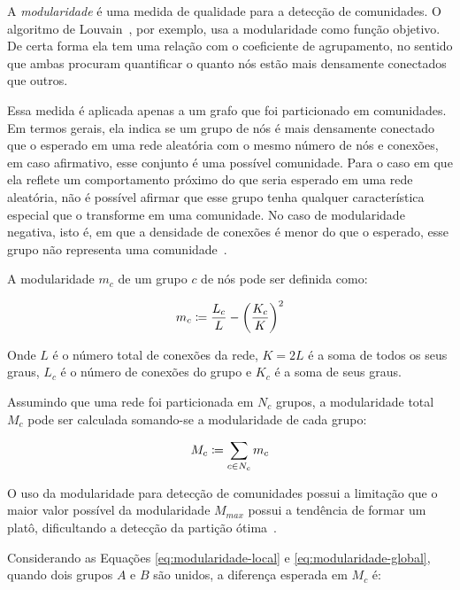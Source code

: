 \documentclass[12pt,a4paper]{article}
\begin{document}

A \textit{modularidade} é uma medida de qualidade para a detecção de comunidades. O algoritmo de Louvain~\cite{Blondel2008-qh}, por exemplo, usa a modularidade como função objetivo. De certa forma ela tem uma relação com o coeficiente de agrupamento, no sentido que ambas procuram quantificar o quanto nós estão mais densamente conectados que outros.

Essa medida é aplicada apenas a um grafo que foi particionado em comunidades. Em termos gerais, ela indica se um grupo de nós é mais densamente conectado que o esperado em uma rede aleatória com o mesmo número de nós e conexões, em caso afirmativo, esse conjunto é uma possível comunidade. Para o caso em que ela reflete um comportamento próximo do que seria esperado em uma rede aleatória, não é possível afirmar que esse grupo tenha qualquer característica especial que o transforme em uma comunidade. No caso de modularidade negativa, isto é, em que a densidade de conexões é menor do que o esperado, esse grupo não representa uma comunidade~\cite{Barabasi2016-rn}.

A modularidade $m_c$ de um grupo $c$ de nós pode ser definida como:

\begin{equation} \label{eq:modularidade-local}
m_c \coloneqq \frac{L_c}{L} - \left( \frac{K_c}{K} \right)^2
\end{equation}

Onde $L$ é o número total de conexões da rede, $K = 2L$ é a soma de todos os seus graus, $L_c$ é o número de conexões do grupo e $K_c$ é a soma de seus graus.

Assumindo que uma rede foi particionada em $N_c$ grupos, a modularidade total $M_c$ pode ser calculada somando-se a modularidade de cada grupo:

\begin{equation} \label{eq:modularidade-global}
M_c \coloneqq \sum_{c \in N_c} m_c
\end{equation}

O uso da modularidade para detecção de comunidades possui a limitação que o maior valor possível da modularidade $M_\textit{max}$ possui a tendência de formar um platô, dificultando a detecção da partição ótima~\cite{Barabasi2016-rn}.

Considerando as Equações \ref{eq:modularidade-local} e \ref{eq:modularidade-global}, quando dois grupos $A$ e $B$ são unidos, a diferença esperada em $M_c$ é:
\end{document}
